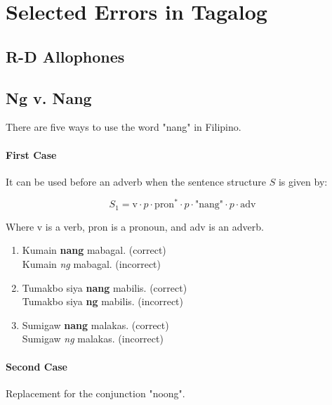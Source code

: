 \section{Selected Errors in Tagalog}
\subsection{R-D Allophones}
\subsection{Ng v. Nang}

There are five ways to use the word "nang" in Filipino.

\paragraph{First Case} It can be used before an adverb when the sentence structure $S$ is given by:

\[
      S_1 = \text{v} \cdot p \cdot \text{pron}^* \cdot p \cdot \text{"nang"} \cdot p \cdot \text{adv}
\]

Where v is a verb, pron is a pronoun, and adv is an adverb.

\begin{example}

\end{example}

\begin{enumerate}
      \item Kumain \textbf{nang} mabagal. (correct)
            \\ Kumain \textit{ng} mabagal. (incorrect)
      \item Tumakbo siya \textbf{nang} mabilis. (correct)
            \\ Tumakbo siya \textbf{ng} mabilis. (incorrect)
      \item Sumigaw \textbf{nang} malakas. (correct)
            \\ Sumigaw \textit{ng} malakas. (incorrect)
\end{enumerate}

\paragraph{Second Case} Replacement for the conjunction "noong".

\begin{example}

\end{example}

